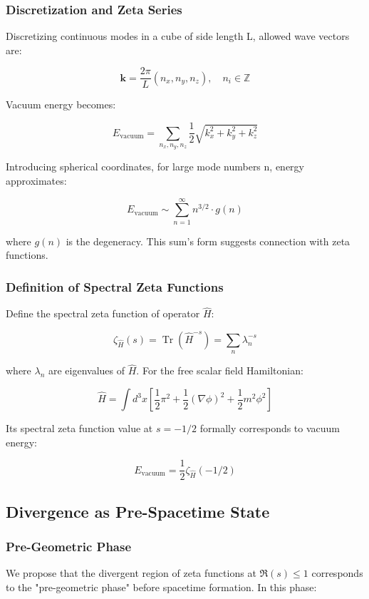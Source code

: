 \documentclass[12pt,a4paper]{article}
\DeclareMathOperator{\Tr}{Tr}
\begin{document}
\subsubsection{Discretization and Zeta Series}

Discretizing continuous modes in a cube of side length L, allowed wave vectors are:

$$\mathbf{k} = \frac{2\pi}{L}(n_x, n_y, n_z), \quad n_i \in \mathbb{Z}$$

Vacuum energy becomes:

$$E_{\text{vacuum}} = \sum_{n_x, n_y, n_z} \frac{1}{2} \sqrt{k_x^2 + k_y^2 + k_z^2}$$

Introducing spherical coordinates, for large mode numbers n, energy approximates:

$$E_{\text{vacuum}} \sim \sum_{n=1}^{\infty} n^{3/2} \cdot g(n)$$

where $g(n)$ is the degeneracy. This sum's form suggests connection with zeta functions.

\subsubsection{Definition of Spectral Zeta Functions}

Define the spectral zeta function of operator $\hat{H}$:

$$\zeta_{\hat{H}}(s) = \Tr(\hat{H}^{-s}) = \sum_n \lambda_n^{-s}$$

where $\lambda_n$ are eigenvalues of $\hat{H}$. For the free scalar field Hamiltonian:

$$\hat{H} = \int d^3x \left[ \frac{1}{2}\pi^2 + \frac{1}{2}(\nabla\phi)^2 + \frac{1}{2}m^2\phi^2 \right]$$

Its spectral zeta function value at $s = -1/2$ formally corresponds to vacuum energy:

$$E_{\text{vacuum}} = \frac{1}{2} \zeta_{\hat{H}}(-1/2)$$

\subsection{Divergence as Pre-Spacetime State}

\subsubsection{Pre-Geometric Phase}

We propose that the divergent region of zeta functions at $\Re(s) \leq 1$ corresponds to the "pre-geometric phase" before spacetime formation. In this phase:
\end{document}
